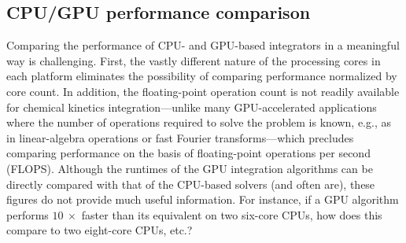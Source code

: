 \documentclass[preprint,review,11pt]{elsarticle}
\begin{document}

\subsection{CPU\slash GPU performance comparison}

Comparing the performance of CPU- and GPU-based integrators in a meaningful way is challenging.
First, the vastly different nature of the processing cores in each platform eliminates the possibility of comparing performance normalized by core count.
In addition, the floating-point operation count is not readily available for chemical kinetics integration---unlike many GPU-accelerated applications where the number of operations required to solve the problem is known, e.g., as in linear-algebra operations or fast Fourier transforms---which precludes comparing performance on the basis of floating-point operations per second (FLOPS).
Although the runtimes of the GPU integration algorithms can be directly compared with that of the CPU-based solvers (and often are), these figures do not provide much useful information.
For instance, if a GPU algorithm performs $\SI{10}{\times}$ faster than its equivalent on two six-core CPUs, how does this compare to two eight-core CPUs, etc.?
\end{document}
